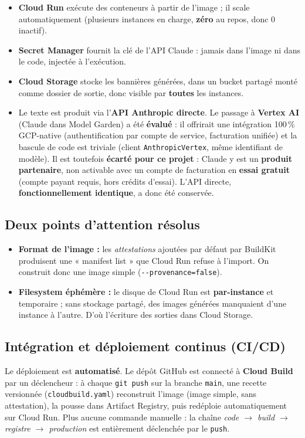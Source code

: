 \documentclass[11pt,a4paper]{article}
\newcommand{\eur}{\texteuro}
\begin{document}
\begin{itemize}[leftmargin=1.4em]
  \item \textbf{Cloud Run} exécute des conteneurs à partir de l'image ; il scale
        automatiquement (plusieurs instances en charge, \textbf{zéro} au repos, donc
        0~\eur{} inactif).
  \item \textbf{Secret Manager} fournit la clé de l'API Claude : jamais dans l'image ni
        dans le code, injectée à l'exécution.
  \item \textbf{Cloud Storage} stocke les bannières générées, dans un bucket partagé monté
        comme dossier de sortie, donc visible par \textbf{toutes} les instances.
  \item Le texte est produit via l'\textbf{API Anthropic directe}. Le passage à
        \textbf{Vertex AI} (Claude dans Model Garden) a été \textbf{évalué} : il
        offrirait une intégration 100\,\% GCP-native (authentification par compte de
        service, facturation unifiée) et la bascule de code est triviale (client
        \texttt{AnthropicVertex}, même identifiant de modèle). Il est toutefois
        \textbf{écarté pour ce projet} : Claude y est un \textbf{produit partenaire},
        non activable avec un compte de facturation en \textbf{essai gratuit} (compte
        payant requis, hors crédits d'essai). L'API directe, \textbf{fonctionnellement
        identique}, a donc été conservée.
\end{itemize}

\subsection{Deux points d'attention résolus}
\begin{itemize}[leftmargin=1.4em]
  \item \textbf{Format de l'image :} les \emph{attestations} ajoutées par défaut par
        BuildKit produisent une « manifest list » que Cloud Run refuse à l'import. On
        construit donc une image simple (\texttt{-{}-provenance=false}).
  \item \textbf{Filesystem éphémère :} le disque de Cloud Run est \textbf{par-instance} et
        temporaire ; sans stockage partagé, des images générées manquaient d'une instance
        à l'autre. D'où l'écriture des sorties dans Cloud Storage.
\end{itemize}

\subsection{Intégration et déploiement continus (CI/CD)}
Le déploiement est \textbf{automatisé}. Le dépôt GitHub est connecté à \textbf{Cloud
Build} par un déclencheur : à chaque \texttt{git push} sur la branche \texttt{main}, une
recette versionnée (\texttt{cloudbuild.yaml}) reconstruit l'image (image simple, sans
attestation), la pousse dans Artifact Registry, puis redéploie automatiquement sur Cloud
Run. Plus aucune commande manuelle : la chaîne \emph{code $\rightarrow$ build
$\rightarrow$ registre $\rightarrow$ production} est entièrement déclenchée par le
\texttt{push}.
\end{document}
